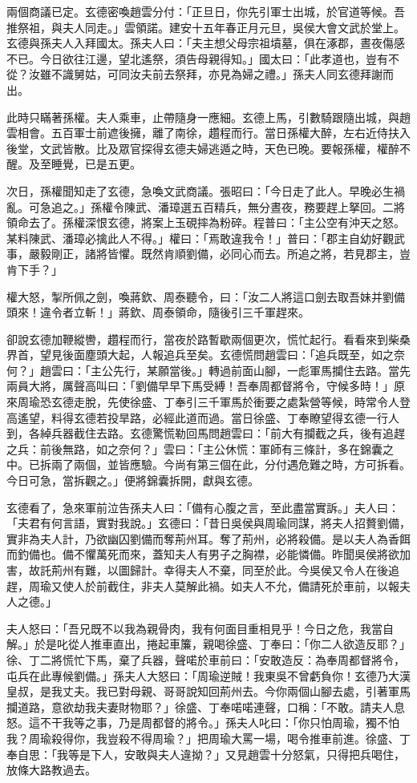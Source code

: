 兩個商議已定。玄德密喚趙雲分付：「正旦日，你先引軍士出城，於官道等候。吾推祭祖，與夫人同走。」雲領諾。建安十五年春正月元旦，吳侯大會文武於堂上。玄德與孫夫人入拜國太。孫夫人曰：「夫主想父母宗祖墳墓，俱在涿郡，晝夜傷感不已。今日欲往江邊，望北遙祭，須告母親得知。」國太曰：「此孝道也，豈有不從？汝雖不識舅姑，可同汝夫前去祭拜，亦見為婦之禮。」孫夫人同玄德拜謝而出。

此時只瞞著孫權。夫人乘車，止帶隨身一應細。玄德上馬，引數騎跟隨出城，與趙雲相會。五百軍士前遮後擁，離了南徐，趲程而行。當日孫權大醉，左右近侍扶入後堂，文武皆散。比及眾官探得玄德夫婦逃遁之時，天色已晚。要報孫權，權醉不醒。及至睡覺，已是五更。

次日，孫權聞知走了玄德，急喚文武商議。張昭曰：「今日走了此人。早晚必生禍亂。可急追之。」孫權令陳武、潘璋選五百精兵，無分晝夜，務要趕上拏回。二將領命去了。孫權深恨玄德，將案上玉硯摔為粉碎。程普曰：「主公空有沖天之怒。某料陳武、潘璋必擒此人不得。」權曰：「焉敢違我令！」普曰：「郡主自幼好觀武事，嚴毅剛正，諸將皆懼。既然肯順劉備，必同心而去。所追之將，若見郡主，豈肯下手？」

權大怒，掣所佩之劍，喚蔣欽、周泰聽令，曰：「汝二人將這口劍去取吾妹并劉備頭來！違令者立斬！」蔣欽、周泰領命，隨後引三千軍趕來。

卻說玄德加鞭縱轡，趲程而行，當夜於路暫歇兩個更次，慌忙起行。看看來到柴桑界首，望見後面塵頭大起，人報追兵至矣。玄德慌問趙雲曰：「追兵既至，如之奈何？」趙雲曰：「主公先行，某願當後。」轉過前面山腳，一彪軍馬攔住去路。當先兩員大將，厲聲高叫曰：「劉備早早下馬受縛！吾奉周都督將令，守候多時！」原來周瑜恐玄德走脫，先使徐盛、丁奉引三千軍馬於衝要之處紮營等候，時常令人登高遙望，料得玄德若投旱路，必經此道而過。當日徐盛、丁奉瞭望得玄德一行人到，各綽兵器截住去路。玄德驚慌勒回馬問趙雲曰：「前大有攔截之兵，後有追趕之兵：前後無路，如之奈何？」雲曰：「主公休慌：軍師有三條計，多在錦囊之中。已拆兩了兩個，並皆應驗。今尚有第三個在此，分付遇危難之時，方可拆看。今日可急，當拆觀之。」便將錦囊拆開，獻與玄德。

玄德看了，急來軍前泣告孫夫人曰：「備有心腹之言，至此盡當實訴。」夫人曰：「夫君有何言語，實對我說。」玄德曰：「昔日吳侯與周瑜同謀，將夫人招贅劉備，實非為夫人計，乃欲幽囚劉備而奪荊州耳。奪了荊州，必將殺備。是以夫人為香餌而釣備也。備不懼萬死而來，蓋知夫人有男子之胸襟，必能憐備。昨聞吳侯將欲加害，故託荊州有難，以圖歸計。幸得夫人不棄，同至於此。今吳侯又令人在後追趕，周瑜又使人於前截住，非夫人莫解此禍。如夫人不允，備請死於車前，以報夫人之德。」

夫人怒曰：「吾兄既不以我為親骨肉，我有何面目重相見乎！今日之危，我當自解。」於是叱從人推車直出，捲起車簾，親喝徐盛、丁奉曰：「你二人欲造反耶？」徐、丁二將慌忙下馬，棄了兵器，聲喏於車前曰：「安敢造反：為奉周都督將令，屯兵在此專候劉備。」孫夫人大怒曰：「周瑜逆賊！我東吳不曾虧負你！玄德乃大漢皇叔，是我丈夫。我已對母親、哥哥說知回荊州去。今你兩個山腳去處，引著軍馬攔道路，意欲劫我夫妻財物耶？」徐盛、丁奉喏喏連聲，口稱：「不敢。請夫人息怒。這不干我等之事，乃是周都督的將令。」孫夫人叱曰：「你只怕周瑜，獨不怕我？周瑜殺得你，我豈殺不得周瑜？」把周瑜大罵一場，喝令推車前進。徐盛、丁奉自思：「我等是下人，安敢與夫人違拗？」又見趙雲十分怒氣，只得把兵喝住，放條大路教過去。


